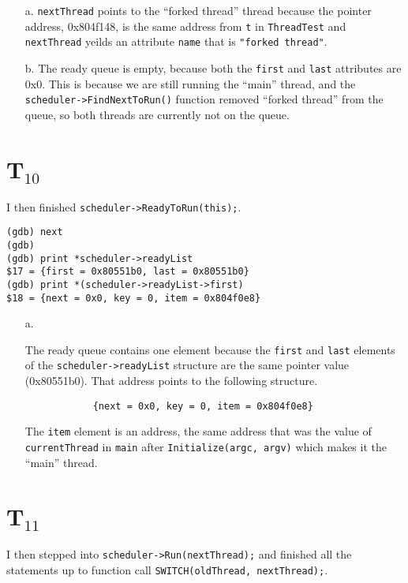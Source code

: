 \documentclass[letterpaper, 10pt]{article}
\begin{document}
	\begin{itemize}
		\item[a.]{
		{\tt nextThread} points to the ``forked thread'' thread because the pointer address, 0x804f148, is the same address from {\tt t} in {\tt ThreadTest} and {\tt *nextThread} yeilds an attribute {\tt name} that is {\tt "forked thread"}.
		}
		\item[b.]{
		The ready queue is empty, because both the {\tt first} and {\tt last} attributes are 0x0. This is because we are still running the ``main'' thread, and the {\tt scheduler->FindNextToRun()} function removed ``forked thread'' from the queue, so both threads are currently not on the queue.
		}
	\end{itemize}

	\section*{T$_{10}$}

	I then finished {\tt scheduler->ReadyToRun(this);}.

	\begin{verbatim}
(gdb) next
(gdb)
(gdb) print *scheduler->readyList
$17 = {first = 0x80551b0, last = 0x80551b0}
(gdb) print *(scheduler->readyList->first)
$18 = {next = 0x0, key = 0, item = 0x804f0e8}
	\end{verbatim}

	\begin{itemize}
		\item[a.]{
		The ready queue contains one element because the {\tt first} and {\tt last} elements of the {\tt scheduler->readyList} structure are the same pointer value (0x80551b0). That address points to the following structure.

		\begin{verbatim}
			{next = 0x0, key = 0, item = 0x804f0e8}
		\end{verbatim}

		The {\tt item} element is an address, the same address that was the value of {\tt currentThread} in {\tt main} after {\tt Initialize(argc, argv)} which makes it the ``main'' thread.
		}
	\end{itemize}

	\section*{T$_{11}$}

	I then stepped into {\tt scheduler->Run(nextThread);} and finished all the statements up to function call {\tt SWITCH(oldThread, nextThread);}.
\end{document}
